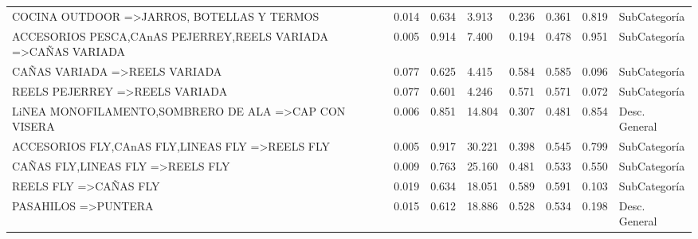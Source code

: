 \documentclass[]{article}
\begin{document}
\begin{landscape}
\begin{table}[htbp]
\begin{tabular}{llllllll}
				{COCINA OUTDOOR} =\textgreater {JARROS, BOTELLAS Y TERMOS} & 0.014 & 0.634 & 3.913 & 0.236 & 0.361 & 0.819 & SubCategoría \\
				{ACCESORIOS PESCA,CAnAS PEJERREY,REELS VARIADA} =\textgreater {CAÑAS VARIADA} & 0.005 & 0.914 & 7.400 & 0.194 & 0.478 & 0.951 & SubCategoría \\
				{CAÑAS VARIADA} =\textgreater {REELS VARIADA} & 0.077 & 0.625 & 4.415 & 0.584 & 0.585 & 0.096 & SubCategoría \\
				{REELS PEJERREY} =\textgreater {REELS VARIADA} & 0.077 & 0.601 & 4.246 & 0.571 & 0.571 & 0.072 & SubCategoría \\
				{LiNEA MONOFILAMENTO,SOMBRERO DE ALA} =\textgreater {CAP CON VISERA} & 0.006 & 0.851 & 14.804 & 0.307 & 0.481 & 0.854 & Desc. General \\
				{ACCESORIOS FLY,CAnAS FLY,LINEAS FLY} =\textgreater {REELS FLY} & 0.005 & 0.917 & 30.221 & 0.398 & 0.545 & 0.799 & SubCategoría \\
				{CAÑAS FLY,LINEAS FLY} =\textgreater {REELS FLY} & 0.009 & 0.763 & 25.160 & 0.481 & 0.533 & 0.550 & SubCategoría \\
				{REELS FLY} =\textgreater {CAÑAS FLY} & 0.019 & 0.634 & 18.051 & 0.589 & 0.591 & 0.103 & SubCategoría \\
				{PASAHILOS} =\textgreater {PUNTERA} & 0.015 & 0.612 & 18.886 & 0.528 & 0.534 & 0.198 & Desc. General \\		 			
			\end{tabular}%
			\label{Tab_Reg_Habituales}%
		\end{table}%
		
	\end{landscape}
	\restoregeometry
		
\end{document}
